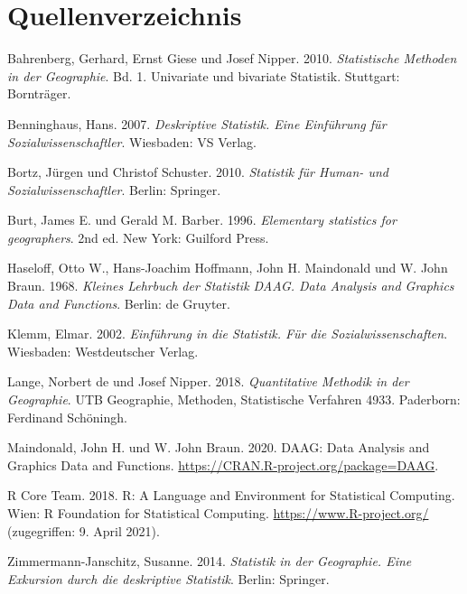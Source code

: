 \documentclass[
  11pt,
  ngerman,
  a4paper,
]{report}
\newlength{\cslhangindent}
\newenvironment{CSLReferences}[2] %
 {%
  \setlength{\parindent}{0pt}
  \ifodd #1 \everypar{\setlength{\hangindent}{\cslhangindent}}\ignorespaces\fi
  \ifnum #2 > 0
  \setlength{\parskip}{#2\baselineskip}
  \fi
 }%
 {}
\begin{document}
\hypertarget{quellenverzeichnis}{%
\chapter*{Quellenverzeichnis}\label{quellenverzeichnis}}

\hypertarget{refs}{}
\begin{CSLReferences}{1}{0}
\leavevmode{}%
Bahrenberg, Gerhard, Ernst Giese und Josef Nipper. 2010. \emph{Statistische Methoden in der Geographie}. Bd. 1. Univariate und bivariate Statistik. Stuttgart: Bornträger.

\leavevmode{}%
Benninghaus, Hans. 2007. \emph{Deskriptive Statistik. Eine Einführung für Sozialwissenschaftler}. Wiesbaden: VS Verlag.

\leavevmode{}%
Bortz, Jürgen und Christof Schuster. 2010. \emph{Statistik für Human- und Sozialwissenschaftler}. Berlin: Springer.

\leavevmode{}%
Burt, James E. und Gerald M. Barber. 1996. \emph{Elementary statistics for geographers}. 2nd ed. New York: Guilford Press.

\leavevmode{}%
Haseloff, Otto W., Hans-Joachim Hoffmann, John H. Maindonald und W. John Braun. 1968. \emph{Kleines Lehrbuch der Statistik DAAG. Data Analysis and Graphics Data and Functions}. Berlin: de Gruyter.

\leavevmode{}%
Klemm, Elmar. 2002. \emph{Einführung in die Statistik. Für die Sozialwissenschaften}. Wiesbaden: Westdeutscher Verlag.

\leavevmode{}%
Lange, Norbert de und Josef Nipper. 2018. \emph{Quantitative Methodik in der Geographie}. {UTB} Geographie, Methoden, Statistische Verfahren 4933. Paderborn: Ferdinand Schöningh.

\leavevmode{}%
Maindonald, John H. und W. John Braun. 2020. DAAG: Data Analysis and Graphics Data and Functions. \url{https://CRAN.R-project.org/package=DAAG}.

\leavevmode{}%
R Core Team. 2018. R: A Language and Environment for Statistical Computing. Wien: R Foundation for Statistical Computing. \url{https://www.R-project.org/} (zugegriffen: 9. April 2021).

\leavevmode{}%
Zimmermann-Janschitz, Susanne. 2014. \emph{Statistik in der Geographie. Eine Exkursion durch die deskriptive Statistik}. Berlin: Springer.

\end{CSLReferences}
\end{document}
